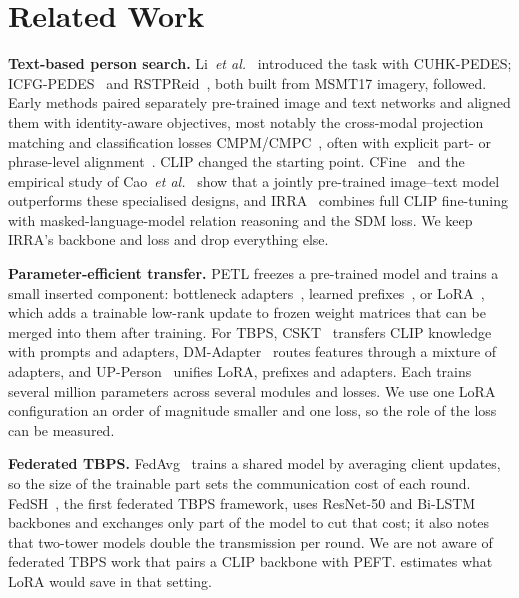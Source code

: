 \section{Related Work}\label{sec:related}

\textbf{Text-based person search.} Li~\textit{et al.}~\cite{li2017personsearchnaturallanguage} introduced the task with CUHK-PEDES; ICFG-PEDES~\cite{ding2021semanticallyselfalignednetworktexttoimage} and RSTPReid~\cite{Zhu_2021}, both built from MSMT17 imagery, followed. Early methods paired separately pre-trained image and text networks and aligned them with identity-aware objectives, most notably the cross-modal projection matching and classification losses CMPM/CMPC~\cite{Zhang_2018}, often with explicit part- or phrase-level alignment~\cite{ding2021semanticallyselfalignednetworktexttoimage}. CLIP changed the starting point. CFine~\cite{yan2022clipdrivenfinegrainedtextimageperson} and the empirical study of Cao~\textit{et al.}~\cite{cao2023empiricalstudycliptextbased} show that a jointly pre-trained image--text model outperforms these specialised designs, and IRRA~\cite{jiang2023crossmodalimplicitrelationreasoning} combines full CLIP fine-tuning with masked-language-model relation reasoning and the SDM loss. We keep IRRA's backbone and loss and drop everything else.

\textbf{Parameter-efficient transfer.} PETL freezes a pre-trained model and trains a small inserted component: bottleneck adapters~\cite{houlsby2019parameterefficienttransferlearningnlp}, learned prefixes~\cite{li2021prefixtuningoptimizingcontinuousprompts}, or LoRA~\cite{hu2021loralowrankadaptationlarge}, which adds a trainable low-rank update to frozen weight matrices that can be merged into them after training. For TBPS, CSKT~\cite{liu2024clipbasedsynergisticknowledgetransfer} transfers CLIP knowledge with prompts and adapters, DM-Adapter~\cite{liu2025dmadapterdomainawaremixtureofadapterstextbased} routes features through a mixture of adapters, and UP-Person~\cite{liu2025uppersonunifiedparameterefficienttransfer} unifies LoRA, prefixes and adapters. Each trains several million parameters across several modules and losses. We use one LoRA configuration an order of magnitude smaller and one loss, so the role of the loss can be measured.

\textbf{Federated TBPS.} FedAvg~\cite{mcmahan2023communicationefficientlearningdeepnetworks} trains a shared model by averaging client updates, so the size of the trainable part sets the communication cost of each round. FedSH~\cite{Ma_2024}, the first federated TBPS framework, uses ResNet-50 and Bi-LSTM backbones and exchanges only part of the model to cut that cost; it also notes that two-tower models double the transmission per round. We are not aware of federated TBPS work that pairs a CLIP backbone with PEFT.  estimates what LoRA would save in that setting.
